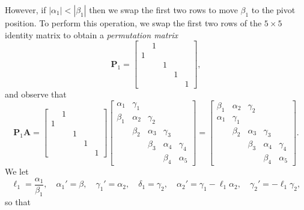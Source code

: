 However, if $|\alpha_1|<|\beta_1|$ then we swap the first two rows to move 
$\beta_1$ to the pivot position.  To perform this operation, we swap the first 
two rows of the $5\times5$ identity matrix to obtain a \emph{permutation matrix}
\[
\boldsymbol{P}_1=\begin{bmatrix}
 &1& & &\\
1& & & &\\
 & &1& &\\
 & & &1&\\
 & & & &1
\end{bmatrix},
\]
and observe that
\[
\boldsymbol{P}_1\boldsymbol{A}=
\begin{bmatrix}
 &1& & &\\
1& & & &\\
 & &1& &\\
 & & &1&\\
 & & & &1
\end{bmatrix}
\begin{bmatrix}
\alpha_1&\gamma_1&        &        &\\
 \beta_1&\alpha_2&\gamma_2&        &\\
        & \beta_2&\alpha_3&\gamma_3&\\
        &        & \beta_3&\alpha_4&\gamma_4\\
        &        &        & \beta_4&\alpha_5
\end{bmatrix}
=\begin{bmatrix}
 \beta_1&\alpha_2&\gamma_2&        &\\
\alpha_1&\gamma_1&        &        &\\
        & \beta_2&\alpha_3&\gamma_3&\\
        &        & \beta_3&\alpha_4&\gamma_4\\
        &        &        & \beta_4&\alpha_5
\end{bmatrix}.
\]
We let
\[
\ell_1=\frac{\alpha_1}{\beta_1},\quad
\alpha_1'=\beta,\quad\gamma_1'=\alpha_2,\quad\delta_1=\gamma_2,\quad
\alpha_2'=\gamma_1-\ell_1\alpha_2,\quad\gamma_2'=-\ell_1\gamma_2,
\]
so that
